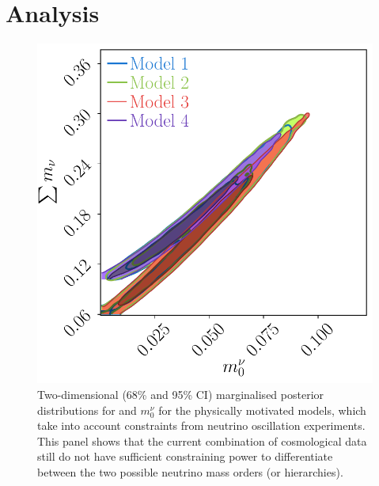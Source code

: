 \section{Analysis}
\begin{figure}
\begin{center}
\includegraphics[scale=0.65]{Neutrino-FIGS/neutrino_hierarc_alt.pdf}
\caption[Two-dimensional (68\% and 95\% CI) marginalised posterior distributions for \NM{} and $m_0^{\nu}$ for the physically motivated models.]{Two-dimensional (68\% and 95\% CI) marginalised posterior distributions for \NM{} and $m_0^{\nu}$ for the physically motivated models, which take into account constraints from neutrino oscillation experiments. This panel shows that the current combination of cosmological data still do not have sufficient constraining power to differentiate between the two possible neutrino mass orders (or hierarchies).}
\label{fig:SumM0}
\end{center}
\end{figure}

